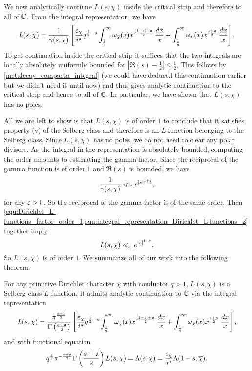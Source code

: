       We now analytically continue $L(s,\chi)$ inside the critical strip and therefore to all of $\mathbb{C}$. From the integral representation, we have
      \begin{equation}\label{equ:integral_representation_Dirichlet_L-functions_2}
        L(s,\chi) = \frac{1}{\gamma(s,\chi)}\left[\frac{\varepsilon_{\chi}}{i^{\mathfrak{a}}}q^{\frac{1}{2}-s}\int_{\frac{1}{q}}^{\infty}\omega_{\overline{\chi}}(x)x^{\frac{(1-s)+\mathfrak{a}}{2}}\,\frac{dx}{x}+\int_{\frac{1}{q}}^{\infty}\omega_{\chi}(x)x^{\frac{s+\mathfrak{a}}{2}}\,\frac{dx}{x}\right].
      \end{equation}
      To get continuation inside the critical strip it suffices that the two integrals are locally absolutely uniformly bounded for $|\Re(s)-\frac{1}{2}| \le \frac{1}{2}$. This follows by \cref{met:decay_compacta_integral} (we could have deduced this continuation earlier but we didn't need it until now) and thus gives analytic continuation to the critical strip and hence to all of $\mathbb{C}$. In particular, we have shown that $L(s,\chi)$ has no poles.

      All we are left to show is that $L(s,\chi)$ is of order $1$ to conclude that it satisfies property (v) of the Selberg class and therefore is an $L$-function belonging to the Selberg class. Since $L(s,\chi)$ has no poles, we do not need to clear any polar divisors. As the integral in the representation is absolutely bounded, computing the order amounts to estimating the gamma factor. Since the reciprocal of the gamma function is of order $1$ and $\Re(s)$ is bounded, we have
      \begin{equation}\label{equ:Dirichlet_L-functions_factor_order_1}
        \frac{1}{\gamma(s,\chi)} \ll_{\varepsilon} e^{|s|^{1+\varepsilon}},
      \end{equation}
      for any $\varepsilon > 0$. So the reciprocal of the gamma factor is of the same order. Then \cref{equ:Dirichlet_L-functions_factor_order_1,equ:integral_representation_Dirichlet_L-functions_2} together imply
      \[
        L(s,\chi) \ll_{\varepsilon} e^{|s|^{1+\varepsilon}}.
      \]
      So $L(s,\chi)$ is of order $1$. We summarize all of our work into the following theorem:

      \begin{theorem}
        For any primitive Dirichlet character $\chi$ with conductor $q > 1$, $L(s,\chi)$ is a Selberg class $L$-function. It admits analytic continuation to $\mathbb{C}$ via the integral representation
        \[
          L(s,\chi) = \frac{\pi^{\frac{s+\mathfrak{a}}{2}}}{\Gamma\left(\frac{s+\mathfrak{a}}{2}\right)}\left[\frac{\varepsilon_{\chi}}{i^{\mathfrak{a}}}q^{\frac{1}{2}-s}\int_{\frac{1}{q}}^{\infty}\omega_{\overline{\chi}}(x)x^{\frac{(1-s)+\mathfrak{a}}{2}}\,\frac{dx}{x}+\int_{\frac{1}{q}}^{\infty}\omega_{\chi}(x)x^{\frac{s+\mathfrak{a}}{2}}\,\frac{dx}{x}\right],
        \]
        and with functional equation
        \[
          q^{\frac{s}{2}}\pi^{-\frac{s+\mathfrak{a}}{2}}\Gamma\left(\frac{s+\mathfrak{a}}{2}\right)L(s,\chi) = \Lambda(s,\chi) = \frac{\varepsilon_{\chi}}{i^{\mathfrak{a}}}\Lambda(1-s,\overline{\chi}).
        \]
      \end{theorem}
